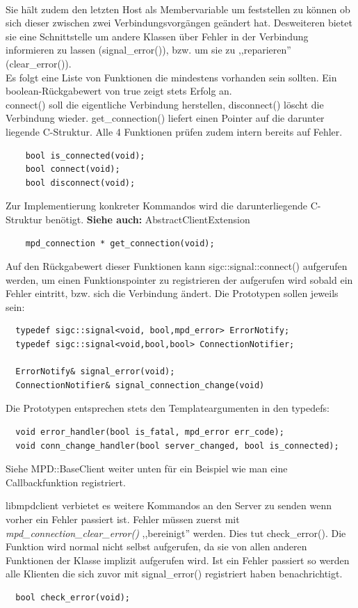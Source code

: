 \\
Sie hält zudem den letzten Host als Membervariable um feststellen zu können ob sich dieser zwischen 
zwei Verbindungsvorgängen geändert hat. Desweiteren bietet sie eine Schnittstelle um andere Klassen über Fehler in der Verbindung informieren zu lassen (signal\_error()), bzw. um sie zu ,,reparieren'' (clear\_error()).
\\
Es folgt eine Liste von Funktionen die mindestens vorhanden sein sollten.
Ein boolean-Rückgabewert von true zeigt stets Erfolg an.
\\
connect() soll die eigentliche Verbindung herstellen, disconnect() löscht die Verbindung wieder.
get\_connection() liefert einen Pointer auf die darunter liegende C-Struktur. Alle 4 Funktionen prüfen 
zudem intern bereits auf Fehler. 
\begin{verbatim}
    bool is_connected(void);
    bool connect(void);
    bool disconnect(void);
\end{verbatim}

Zur Implementierung konkreter Kommandos wird die darunterliegende C-Struktur benötigt.
\textbf{Siehe auch:} AbstractClientExtension
\begin{verbatim}
    mpd_connection * get_connection(void);
\end{verbatim}

Auf den Rückgabewert dieser Funktionen kann sigc::signal::connect() aufgerufen werden, 
um einen Funktionspointer zu registrieren der aufgerufen wird sobald ein Fehler eintritt,
bzw. sich die Verbindung ändert. Die Prototypen sollen jeweils sein:
\begin{verbatim}
  typedef sigc::signal<void, bool,mpd_error> ErrorNotify;
  typedef sigc::signal<void,bool,bool> ConnectionNotifier;
    
  ErrorNotify& signal_error(void);
  ConnectionNotifier& signal_connection_change(void)
\end{verbatim}

Die Prototypen entsprechen stets den Templateargumenten in den typedefs:
\begin{verbatim}
  void error_handler(bool is_fatal, mpd_error err_code);
  void conn_change_handler(bool server_changed, bool is_connected); 
\end{verbatim} 

Siehe MPD::BaseClient weiter unten für ein Beispiel wie man eine Callbackfunktion registriert.

libmpdclient verbietet es weitere Kommandos an den Server zu senden wenn vorher ein Fehler passiert ist.
Fehler müssen zuerst mit \emph{mpd\_connection\_clear\_error()} ,,bereinigt'' werden. 
Dies tut check\_error(). Die Funktion wird normal nicht selbst aufgerufen, da sie von allen anderen Funktionen der Klasse
implizit aufgerufen wird. Ist ein Fehler passiert so werden alle Klienten die sich zuvor
mit signal\_error() registriert haben benachrichtigt. 
\begin{verbatim}
  bool check_error(void);
\end{verbatim}

